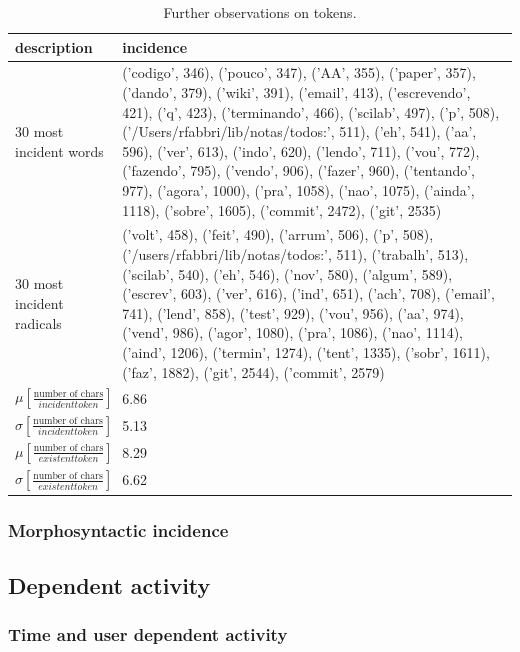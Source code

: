 \documentclass[a4paper, 11pt]{article} %
\begin{document}
\begin{table}[!h]
    \hspace{-25mm}
  \caption{Further observations on tokens. }\label{tab:msgTy}
  \begin{tabular}{|l|p{11cm}|}\hline
      {\bf description } & {\bf incidence }  \\\hline\hline
30 most incident words & ('codigo', 346), ('pouco', 347), ('AA', 355), ('paper', 357), ('dando', 379), ('wiki', 391), ('email', 413), ('escrevendo', 421), ('q', 423), ('terminando', 466), ('scilab', 497), ('p', 508), ('/Users/rfabbri/lib/notas/todos:', 511), ('eh', 541), ('aa', 596), ('ver', 613), ('indo', 620), ('lendo', 711), ('vou', 772), ('fazendo', 795), ('vendo', 906), ('fazer', 960), ('tentando', 977), ('agora', 1000), ('pra', 1058), ('nao', 1075), ('ainda', 1118), ('sobre', 1605), ('commit', 2472), ('git', 2535)  \\ \hline
30 most incident radicals & ('volt', 458), ('feit', 490), ('arrum', 506), ('p', 508), ('/users/rfabbri/lib/notas/todos:', 511), ('trabalh', 513), ('scilab', 540), ('eh', 546), ('nov', 580), ('algum', 589), ('escrev', 603), ('ver', 616), ('ind', 651), ('ach', 708), ('email', 741), ('lend', 858), ('test', 929), ('vou', 956), ('aa', 974), ('vend', 986), ('agor', 1080), ('pra', 1086), ('nao', 1114), ('aind', 1206), ('termin', 1274), ('tent', 1335), ('sobr', 1611), ('faz', 1882), ('git', 2544), ('commit', 2579)  \\ \hline
$\mu [ \frac{\textrm{number of chars}}{incident token}]$ & 6.86  \\\hline
$\sigma [\frac{\textrm{number of chars}}{incident token}]$ & 5.13 \\\hline
$\mu [ \frac{\textrm{number of chars}}{existent token}]$ & 8.29  \\\hline
$\sigma [\frac{\textrm{number of chars}}{existent token}]$ & 6.62 \\\hline
  \end{tabular}
\end{table}



\subsubsection{Morphosyntactic incidence}
\subsection{Dependent activity}
\subsubsection{Time and user dependent activity}
\end{document}

